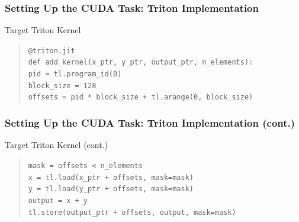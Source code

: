 \documentclass[aspectratio=169]{beamer}
\begin{document}
\begin{frame}
	\frametitle{Setting Up the CUDA Task: Triton Implementation}
	\begin{block}{Target Triton Kernel}
	\begin{quote}
	\texttt{@triton.jit}\\  
	\texttt{def add\_kernel(x\_ptr, y\_ptr, output\_ptr, n\_elements):}\\  
	\texttt{\phantom{xxxx}pid = tl.program\_id(0)}\\  
	\texttt{\phantom{xxxx}block\_size = 128}\\  
	\texttt{\phantom{xxxx}offsets = pid * block\_size + tl.arange(0, block\_size)}
	\end{quote}
	\end{block}
\end{frame}

\begin{frame}
	\frametitle{Setting Up the CUDA Task: Triton Implementation (cont.)}
	\begin{block}{Target Triton Kernel (cont.)}
	\begin{quote}
	\texttt{\phantom{xxxx}mask = offsets < n\_elements}\\  
	\texttt{\phantom{xxxx}x = tl.load(x\_ptr + offsets, mask=mask)}\\  
	\texttt{\phantom{xxxx}y = tl.load(y\_ptr + offsets, mask=mask)}\\  
	\texttt{\phantom{xxxx}output = x + y}\\  
	\texttt{\phantom{xxxx}tl.store(output\_ptr + offsets, output, mask=mask)}
	\end{quote}
	\end{block}
\end{frame}
\end{document}
